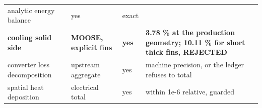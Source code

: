 \documentclass[10pt,]{article}
\begin{document}
\begin{longtable}[]{@{}llll@{}}
\begin{minipage}[t]{0.22\columnwidth}
analytic energy balance\strut
\end{minipage} & \begin{minipage}[t]{0.22\columnwidth}\raggedright
yes\strut
\end{minipage} & \begin{minipage}[t]{0.22\columnwidth}\raggedright
exact\strut
\end{minipage}\tabularnewline
\begin{minipage}[t]{0.22\columnwidth}\raggedright
\textbf{cooling solid side}\strut
\end{minipage} & \begin{minipage}[t]{0.22\columnwidth}\raggedright
\textbf{MOOSE, explicit fins}\strut
\end{minipage} & \begin{minipage}[t]{0.22\columnwidth}\raggedright
\textbf{yes}\strut
\end{minipage} & \begin{minipage}[t]{0.22\columnwidth}\raggedright
\textbf{3.78 \% at the production geometry; 10.11 \% for short thick
fins, REJECTED}\strut
\end{minipage}\tabularnewline
\begin{minipage}[t]{0.22\columnwidth}\raggedright
converter loss decomposition\strut
\end{minipage} & \begin{minipage}[t]{0.22\columnwidth}\raggedright
upstream aggregate\strut
\end{minipage} & \begin{minipage}[t]{0.22\columnwidth}\raggedright
yes\strut
\end{minipage} & \begin{minipage}[t]{0.22\columnwidth}\raggedright
machine precision, or the ledger refuses to total\strut
\end{minipage}\tabularnewline
\begin{minipage}[t]{0.22\columnwidth}\raggedright
spatial heat deposition\strut
\end{minipage} & \begin{minipage}[t]{0.22\columnwidth}\raggedright
electrical total\strut
\end{minipage} & \begin{minipage}[t]{0.22\columnwidth}\raggedright
yes\strut
\end{minipage} & \begin{minipage}[t]{0.22\columnwidth}\raggedright
within 1e-6 relative, guarded\strut
\end{minipage}\tabularnewline

\end{longtable}
\end{document}
